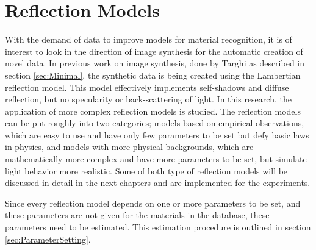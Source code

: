 \section{Reflection Models}\label{sec:ReflectionModels}
With the demand of data to improve models for material recognition, it is of interest to look in the direction of image synthesis for the automatic creation of novel data. In previous work on image synthesis, done by Targhi as described in section \ref{sec:Minimal}, the synthetic data is being created using the Lambertian reflection model. This model effectively implements self-shadows and diffuse reflection, but no specularity or back-scattering of light. In this research, the application of more complex reflection models is studied. The reflection models can be put roughly into two categories; models based on empirical observations, which are easy to use and have only few parameters to be set but defy basic laws in physics, and models with more physical backgrounds, which are mathematically more complex and have more parameters to be set, but simulate light behavior more realistic. Some of both type of reflection models will be discussed in detail in the next chapters and are implemented for the experiments.

Since every reflection model depends on one or more parameters to be set, and these parameters are not given for the materials in the database, these parameters need to be estimated. This estimation procedure is outlined in section \ref{sec:ParameterSetting}.


